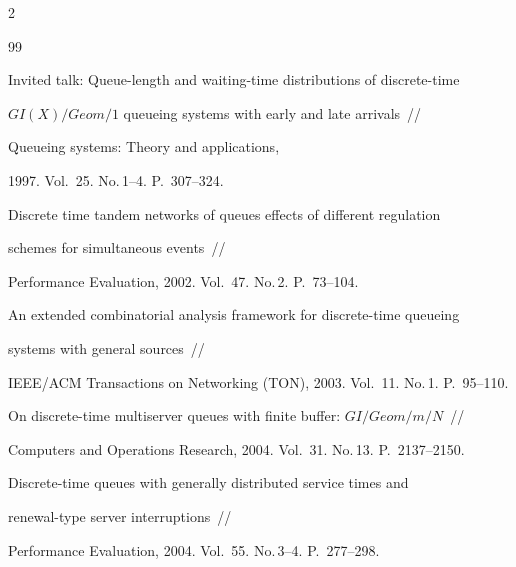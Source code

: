 \begin{multicols}{2}
{{\begin{thebibliography}{99}




Invited talk: Queue-length and waiting-time distributions of discrete-time


$GI(X)/Geom/1$ queueing systems with early and late arrivals~//


Queueing systems: Theory and applications,


1997. Vol.~25. No.\,1--4. P.~307--324.









Discrete time tandem networks of queues effects of different regulation


schemes for simultaneous events~//


Performance Evaluation, 2002. Vol.~47. No.\,2. P.~73--104.









An extended combinatorial analysis framework for discrete-time queueing


systems with general sources~//


IEEE/ACM Transactions on Networking (TON), 2003. Vol.~11. No.\,1. P.~95--110.









On discrete-time multiserver queues with finite buffer: $GI/Geom/m/N$~//


Computers and Operations Research, 2004. Vol.~31. No.\,13. P.~2137--2150.









Discrete-time queues with generally distributed service times and


renewal-type server interruptions~//


Performance Evaluation, 2004. Vol.~55. No.\,3--4. P.~277--298.








\end{thebibliography}}}
\end{multicols}
